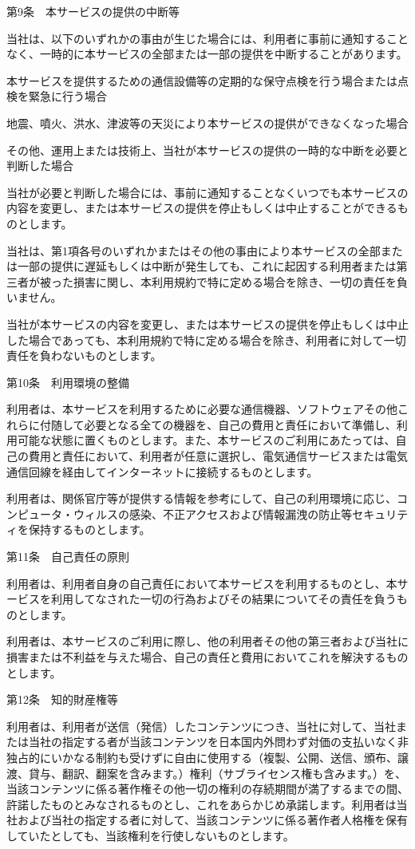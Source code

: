 第9条　本サービスの提供の中断等

    当社は、以下のいずれかの事由が生じた場合には、利用者に事前に通知することなく、一時的に本サービスの全部または一部の提供を中断することがあります。

        本サービスを提供するための通信設備等の定期的な保守点検を行う場合または点検を緊急に行う場合

        地震、噴火、洪水、津波等の天災により本サービスの提供ができなくなった場合

        その他、運用上または技術上、当社が本サービスの提供の一時的な中断を必要と判断した場合

    当社が必要と判断した場合には、事前に通知することなくいつでも本サービスの内容を変更し、または本サービスの提供を停止もしくは中止することができるものとします。

    当社は、第1項各号のいずれかまたはその他の事由により本サービスの全部または一部の提供に遅延もしくは中断が発生しても、これに起因する利用者または第三者が被った損害に関し、本利用規約で特に定める場合を除き、一切の責任を負いません。

    当社が本サービスの内容を変更し、または本サービスの提供を停止もしくは中止した場合であっても、本利用規約で特に定める場合を除き、利用者に対して一切責任を負わないものとします。

第10条　利用環境の整備

    利用者は、本サービスを利用するために必要な通信機器、ソフトウェアその他これらに付随して必要となる全ての機器を、自己の費用と責任において準備し、利用可能な状態に置くものとします。また、本サービスのご利用にあたっては、自己の費用と責任において、利用者が任意に選択し、電気通信サービスまたは電気通信回線を経由してインターネットに接続するものとします。

    利用者は、関係官庁等が提供する情報を参考にして、自己の利用環境に応じ、コンピュータ・ウィルスの感染、不正アクセスおよび情報漏洩の防止等セキュリティを保持するものとします。

第11条　自己責任の原則

    利用者は、利用者自身の自己責任において本サービスを利用するものとし、本サービスを利用してなされた一切の行為およびその結果についてその責任を負うものとします。

    利用者は、本サービスのご利用に際し、他の利用者その他の第三者および当社に損害または不利益を与えた場合、自己の責任と費用においてこれを解決するものとします。

第12条　知的財産権等

    利用者は、利用者が送信（発信）したコンテンツにつき、当社に対して、当社または当社の指定する者が当該コンテンツを日本国内外問わず対価の支払いなく非独占的にいかなる制約も受けずに自由に使用する（複製、公開、送信、頒布、譲渡、貸与、翻訳、翻案を含みます。）権利（サブライセンス権も含みます。）を、当該コンテンツに係る著作権その他一切の権利の存続期間が満了するまでの間、許諾したものとみなされるものとし、これをあらかじめ承諾します。利用者は当社および当社の指定する者に対して、当該コンテンツに係る著作者人格権を保有していたとしても、当該権利を行使しないものとします。

